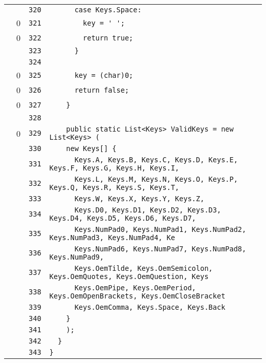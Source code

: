 \documentclass[a4paper,10pt]{article}
\begin{document}
\begin{longtable}[l]{lrrl}
\cellcolor{gray} &  & \verb~320~ & \verb~      case Keys.Space:~\\
\cellcolor{red} & 0 & \verb~321~ & \verb~        key = ' ';~\\
\cellcolor{red} & 0 & \verb~322~ & \verb~        return true;~\\
\cellcolor{gray} &  & \verb~323~ & \verb~      }~\\
\cellcolor{gray} &  & \verb~324~ & \verb~~\\
\cellcolor{red} & 0 & \verb~325~ & \verb~      key = (char)0;~\\
\cellcolor{red} & 0 & \verb~326~ & \verb~      return false;~\\
\cellcolor{red} & 0 & \verb~327~ & \verb~    }~\\
\cellcolor{gray} &  & \verb~328~ & \verb~~\\
\cellcolor{red} & 0 & \verb~329~ & \verb~    public static List<Keys> ValidKeys = new List<Keys> (~\\
\cellcolor{gray} &  & \verb~330~ & \verb~    new Keys[] {~\\
\cellcolor{gray} &  & \verb~331~ & \verb~      Keys.A, Keys.B, Keys.C, Keys.D, Keys.E, Keys.F, Keys.G, Keys.H, Keys.I, ~\\
\cellcolor{gray} &  & \verb~332~ & \verb~      Keys.L, Keys.M, Keys.N, Keys.O, Keys.P, Keys.Q, Keys.R, Keys.S, Keys.T, ~\\
\cellcolor{gray} &  & \verb~333~ & \verb~      Keys.W, Keys.X, Keys.Y, Keys.Z,~\\
\cellcolor{gray} &  & \verb~334~ & \verb~      Keys.D0, Keys.D1, Keys.D2, Keys.D3, Keys.D4, Keys.D5, Keys.D6, Keys.D7, ~\\
\cellcolor{gray} &  & \verb~335~ & \verb~      Keys.NumPad0, Keys.NumPad1, Keys.NumPad2, Keys.NumPad3, Keys.NumPad4, Ke~\\
\cellcolor{gray} &  & \verb~336~ & \verb~      Keys.NumPad6, Keys.NumPad7, Keys.NumPad8, Keys.NumPad9,~\\
\cellcolor{gray} &  & \verb~337~ & \verb~      Keys.OemTilde, Keys.OemSemicolon, Keys.OemQuotes, Keys.OemQuestion, Keys~\\
\cellcolor{gray} &  & \verb~338~ & \verb~      Keys.OemPipe, Keys.OemPeriod, Keys.OemOpenBrackets, Keys.OemCloseBracket~\\
\cellcolor{gray} &  & \verb~339~ & \verb~      Keys.OemComma, Keys.Space, Keys.Back~\\
\cellcolor{gray} &  & \verb~340~ & \verb~    }~\\
\cellcolor{gray} &  & \verb~341~ & \verb~    );~\\
\cellcolor{gray} &  & \verb~342~ & \verb~  }~\\
\cellcolor{gray} &  & \verb~343~ & \verb~}~\\
\end{longtable}
\newpage
\end{document}
